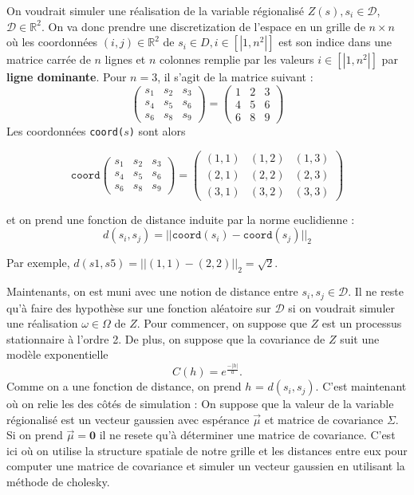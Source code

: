 \documentclass[10pt]{article} %
\begin{document}
On voudrait simuler une réalisation de la variable régionalisé $Z(s), s_i \in \mathcal{D}$, $\mathcal{D} \in \mathbb{R}^2$.
On va donc prendre une discretization de l'espace en un grille de $n \times n$ où les coordonnées
$(i, j) \in \mathbb{R}^2$ de $s_i \in D, i \in [|1, n^2|]$ est son indice dans une matrice carrée de $n$ lignes et $n$
colonnes remplie par les valeurs $i \in [|1, n^2|]$ par \textbf{ligne dominante}. Pour $n = 3$, il s'agit de la matrice suivant :
$$
    \begin{pmatrix}
        s_1 & s_2 & s_3 \\
        s_4 & s_5 & s_6 \\
        s_6 & s_8 & s_9
    \end{pmatrix}
    =
    \begin{pmatrix}
        1 & 2 & 3 \\
        4 & 5 & 6 \\
        6 & 8 & 9
    \end{pmatrix}
$$
Les coordonnées \texttt{coord($s$)} sont alors

$$
    \texttt{coord}
    \begin{pmatrix}
        s_1 & s_2 & s_3 \\
        s_4 & s_5 & s_6 \\
        s_6 & s_8 & s_9
    \end{pmatrix}
    =
    \begin{pmatrix}
        (1, 1) & (1, 2) & (1, 3) \\
        (2, 1) & (2, 2) &(2, 3) \\
        (3, 1) & (3, 2) & (3, 3)
    \end{pmatrix}
$$

et on prend une fonction de distance induite par la norme euclidienne :
$$ d(s_i, s_j) = || \texttt{coord}(s_i) - \texttt{coord}(s_j)||_2 $$

Par exemple, $d(s1, s5) = ||(1, 1) - (2, 2)||_2 = \sqrt{2}$.

Maintenants, on est muni avec une notion de distance entre $s_i, s_j \in \mathcal{D}$. Il ne reste qu'à faire des hypothèse sur une fonction
aléatoire sur $\mathcal{D}$ si on voudrait simuler une réalisation $\omega \in \Omega$ de $Z$. Pour commencer, on suppose que $Z$ est un
processus stationnaire à l'ordre 2. De plus, on suppose que la covariance de $Z$ suit une modèle exponentielle
$$ C(h) = e^{\frac{-|h|}{a}}. $$
Comme on a une fonction de distance, on prend $h$ = $d(s_i, s_j)$. C'est maintenant où on relie les des côtés de simulation : On suppose que
la valeur de la variable régionalisé est un vecteur gaussien avec espérance $\vec \mu$ et matrice de covariance $\Sigma$. Si on prend $\vec\mu = \textbf{0}$ il ne resete
qu'à déterminer une matrice de covariance. C'est ici où on utilise la structure spatiale de notre grille et les distances entre eux pour computer une matrice
de covariance et simuler un vecteur gaussien en utilisant la méthode de cholesky.
\end{document}

